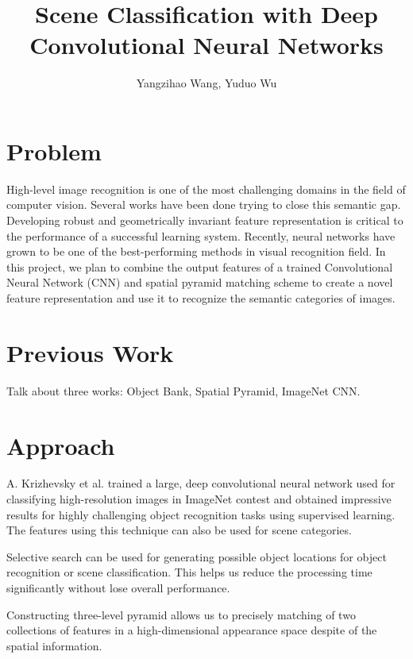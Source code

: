 \documentclass[letterpaper,twocolumn,11pt]{article}
\title{Scene Classification with Deep Convolutional Neural Networks}
\author{Yangzihao Wang, Yuduo Wu}
\date{} %
\begin{document}
\maketitle

\section{Problem}
High-level image recognition is one of the most challenging domains in the field of computer vision. Several works have been done trying to close this semantic gap. Developing robust and geometrically invariant feature representation is critical to the performance of a successful learning system. Recently, neural networks have grown to be one of the best-performing methods in visual recognition field. In this project, we plan to combine the output features of a trained Convolutional Neural Network (CNN) and spatial pyramid matching scheme to create a novel feature representation and use it to recognize the semantic categories of images.


\section{Previous Work}
Talk about three works: Object Bank, Spatial Pyramid, ImageNet CNN.

\section{Approach}
\par
	A. Krizhevsky et al.\cite{CNN} trained a large, deep convolutional neural network used for classifying high-resolution images in ImageNet contest
	and obtained impressive results for highly challenging object recognition
	tasks using	supervised learning. The features using this technique can also
	be used	for scene categories.

\par
	Selective search\cite{SS} can be used for generating possible object
	locations for object recognition or scene classification. This helps us
	reduce the processing time significantly without lose overall performance.

\par
	Constructing three-level pyramid allows us to precisely matching of two
	collections of features in a high-dimensional appearance space despite
	of the spatial information.\cite{SPM}
\end{document}
